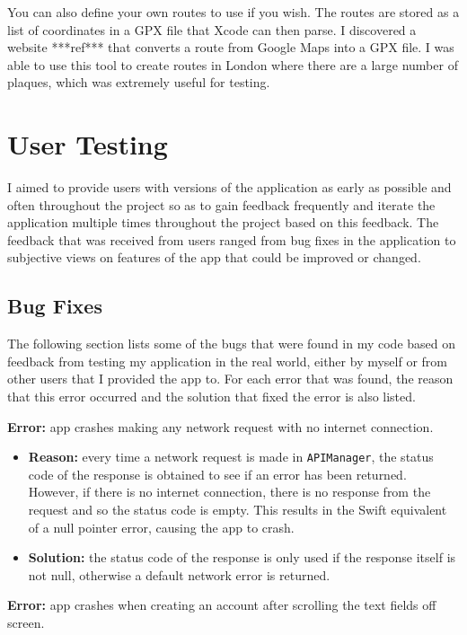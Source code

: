 You can also define your own routes to use if you wish. The routes are stored as a list of coordinates in a GPX file that Xcode can then parse. I discovered a website ***ref*** that converts a route from Google Maps into a GPX file. I was able to use this tool to create routes in London where there are a large number of plaques, which was extremely useful for testing.

\section{User Testing}

I aimed to provide users with versions of the application as early as possible and often throughout the project so as to gain feedback frequently and iterate the application multiple times throughout the project based on this feedback. The feedback that was received from users ranged from bug fixes in the application to subjective views on features of the app that could be improved or changed.

\subsection{Bug Fixes}

The following section lists some of the bugs that were found in my code based on feedback from testing my application in the real world, either by myself or from other users that I provided the app to. For each error that was found, the reason that this error occurred and the solution that fixed the error is also listed.

\noindent \textbf{Error:} app crashes making any network request with no internet connection.

\begin{itemize}
  \item \textbf{Reason:} every time a network request is made in \verb|APIManager|, the status code of the response is obtained to see if an error has been returned. However, if there is no internet connection, there is no response from the request and so the status code is empty. This results in the Swift equivalent of a null pointer error, causing the app to crash.
  
  \item \textbf{Solution:} the status code of the response is only used if the response itself is not null, otherwise a default network error is returned.
\end{itemize}
  
\noindent \textbf{Error:} app crashes when creating an account after scrolling the text fields off screen.

